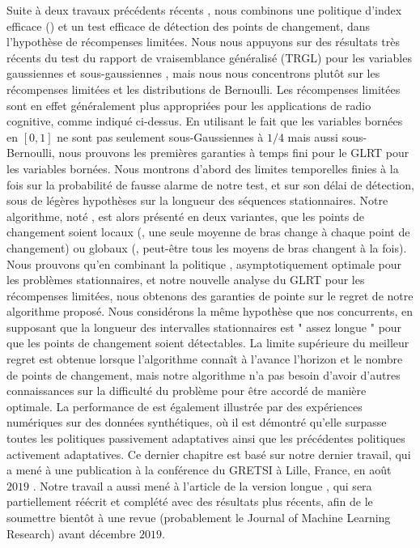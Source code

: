 \begin{resume_fr}
Suite à deux travaux précédents récents \cite{LiuLeeShroff17,CaoZhenKvetonXie18}, nous combinons une politique d'index efficace (\klUCB) et un test efficace de détection des points de changement, dans l'hypothèse de récompenses limitées.
Nous nous appuyons sur des résultats très récents du test du rapport de vraisemblance généralisé (TRGL) pour les variables gaussiennes et sous-gaussiennes \cite{Maillard2018GLR}, mais nous nous concentrons plutôt sur les récompenses limitées et les distributions de Bernoulli.
Les récompenses limitées sont en effet généralement plus appropriées pour les applications de radio cognitive, comme indiqué ci-dessus.
En utilisant le fait que les variables bornées en $[0,1]$ ne sont pas seulement sous-Gaussiennes à $1/4$ mais aussi sous-Bernoulli, nous prouvons les premières garanties à temps fini pour le GLRT pour les variables bornées.
Nous montrons d'abord des limites temporelles finies à la fois sur la probabilité de fausse alarme de notre test, et sur son délai de détection, sous de légères hypothèses sur la longueur des séquences stationnaires.
Notre algorithme, noté \GLRklUCB, est alors présenté en deux variantes, que les points de changement soient locaux (\ie, une seule moyenne de bras change à chaque point de changement) ou globaux (\ie, peut-être tous les moyens de bras changent à la fois).
%
Nous prouvons qu'en combinant la politique \klUCB, asymptotiquement optimale pour les problèmes stationnaires, et notre nouvelle analyse du GLRT pour les récompenses limitées, nous obtenons des garanties de pointe sur le regret de notre algorithme proposé.
Nous considérons la même hypothèse que nos concurrents, en supposant que la longueur des intervalles stationnaires est " assez longue " pour que les points de changement soient détectables.
La limite supérieure du meilleur regret est obtenue lorsque l'algorithme connaît à l'avance l'horizon et le nombre de points de changement, mais notre algorithme n'a pas besoin d'avoir d'autres connaissances sur la difficulté du problème pour être accordé de manière optimale.
%
La performance de \GLRklUCB{} est également illustrée par des expériences numériques sur des données synthétiques, où il est démontré qu'elle surpasse toutes les politiques passivement adaptatives ainsi que les précédentes politiques activement adaptatives.
%
Ce dernier chapitre est basé sur notre dernier travail, qui a mené à une publication à la conférence du GRETSI à Lille, France, en août $2019$ \cite{Besson2019Gretsi}.
Notre travail a aussi mené à l'article de la version longue \cite{Besson2019GLRT}, qui sera partiellement réécrit et complété avec des résultats plus récents, afin de le soumettre bientôt à une revue (probablement le Journal of Machine Learning Research) avant décembre $2019$.



\end{resume_fr}
